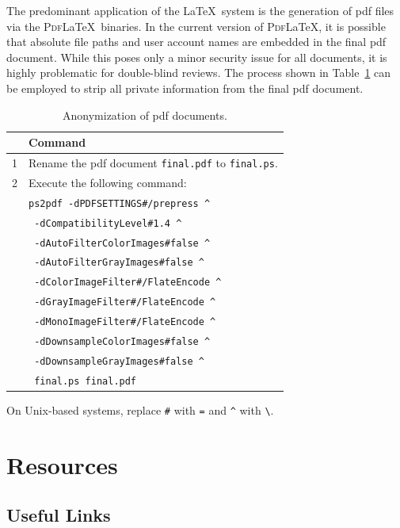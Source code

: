 The predominant application of the \LaTeX\ system is the generation of \gls{pdf} files via the \textsc{Pdf}\LaTeX\ binaries.
In the current version of \textsc{Pdf}\LaTeX, it is possible that absolute file paths and user account names are embedded in the final \gls{pdf} document.
While this poses only a minor security issue for all documents, it is highly problematic for double-blind reviews.
The process shown in Table~\ref{tab:ps2pdf} can be employed to strip all private information from the final \gls{pdf} document.

\begin{table}[ht]
  \centering
  \begin{tabular}{rl}
  \toprule
  & Command \\
  \midrule
  1 & Rename the \gls{pdf} document \verb|final.pdf| to \verb|final.ps|. \\
  2 & Execute the following command: \\
    & \verb|ps2pdf -dPDFSETTINGS#/prepress ^| \\
    & \verb| -dCompatibilityLevel#1.4 ^| \\
    & \verb| -dAutoFilterColorImages#false ^| \\
    & \verb| -dAutoFilterGrayImages#false ^| \\
    & \verb| -dColorImageFilter#/FlateEncode ^| \\
    & \verb| -dGrayImageFilter#/FlateEncode ^| \\
    & \verb| -dMonoImageFilter#/FlateEncode ^| \\
    & \verb| -dDownsampleColorImages#false ^| \\
    & \verb| -dDownsampleGrayImages#false ^| \\
    & \verb| final.ps final.pdf| \\
  \bottomrule
  \end{tabular}

  On Unix-based systems, replace \verb|#| with \verb|=| and \verb|^| with \verb|\|.
  \caption{Anonymization of \gls{pdf} documents.}
  \label{tab:ps2pdf}
\end{table}

\section{Resources}

\subsection{Useful Links}

